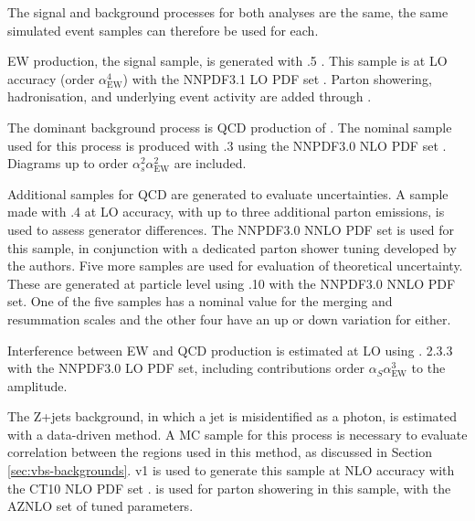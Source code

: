 

The signal and background processes for both analyses are the same, the same
simulated event samples can therefore be used for each.

\ac{EW} \Zyjj production, the signal sample, is generated with .5 \cite{madgraph5amc}.  This sample is at \ac{LO} accuracy (order
$\alpha_\text{EW}^4$) with the NNPDF3.1 \ac{LO} \ac{PDF} set \cite{NNPDF3dot1}.
Parton showering, hadronisation, and underlying event activity are added through
 \cite{pythia8dot2}.

The dominant background process is \ac{QCD} production of \Zyjj. The nominal
sample used for this process is produced with .3
\cite{madgraph5amc} using the NNPDF3.0 \ac{NLO} \ac{PDF} set \cite{NNPDF3dot0}.
Diagrams up to order $\alpha_s^2\alpha_\text{EW}^2$ are included.

Additional samples for \ac{QCD} \Zyjj are generated to evaluate uncertainties.
A sample made with .4 \cite{sherpa2dot2} at \ac{LO} accuracy, with up
to three additional parton emissions, is used to assess generator differences.
The NNPDF3.0 \ac{NNLO} \ac{PDF} set is used for this sample, in conjunction with
a dedicated parton shower tuning developed by the \sherpa authors.
%
Five more samples are used for evaluation of theoretical uncertainty. These are
generated at particle level using .10 \cite{sherpa2dot2} with the
NNPDF3.0 \ac{NNLO} \ac{PDF} set.  One of the five samples has a nominal value
for the merging and resummation scales and the other four have an up or down
variation for either.

Interference between \ac{EW} and \ac{QCD} \Zy production is estimated at \ac{LO}
using \madgraphfiveamc. 2.3.3 with the NNPDF3.0 \ac{LO} PDF set, including
contributions order $\alpha_S\alpha_\text{EW}^3$ to the amplitude.

The Z+jets background, in which a jet is misidentified as a photon, is estimated
with a data-driven method. A \ac{MC} sample for this process is necessary to
evaluate correlation between the regions used in this method, as discussed in
Section \ref{sec:vbs-backgrounds}.
\powhegbox v1 \cite{Nason2004,powheg,powhegbox}
is used to generate this sample at \ac{NLO} accuracy with the CT10 \ac{NLO}
\ac{PDF} set \cite{ct10}.
 \cite{pythia8dot2}
is used for parton showering in this sample, with the AZNLO \cite{AZNLOtune}
set of tuned parameters.

